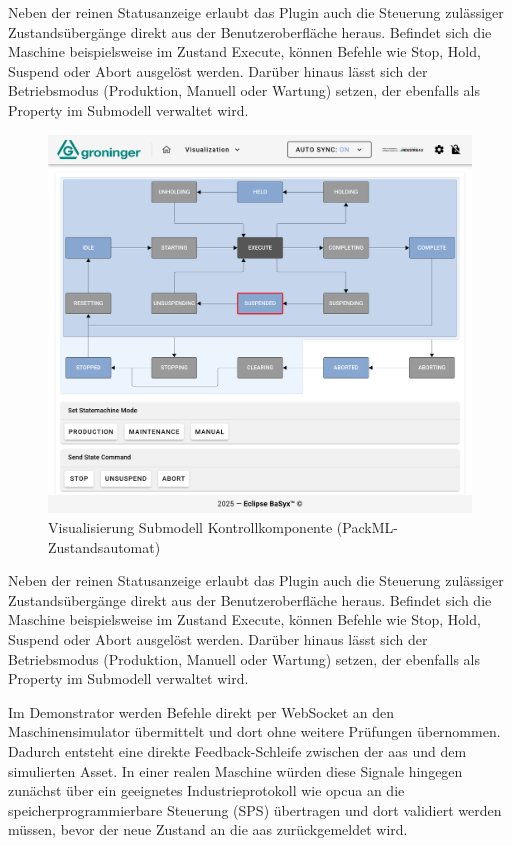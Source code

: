 Neben der reinen Statusanzeige erlaubt das Plugin auch die Steuerung zulässiger Zustandsübergänge direkt aus der Benutzeroberfläche heraus.
Befindet sich die Maschine beispielsweise im Zustand Execute, können Befehle wie Stop, Hold, Suspend oder Abort ausgelöst werden.
Darüber hinaus lässt sich der Betriebsmodus (Produktion, Manuell oder Wartung) setzen, der ebenfalls als Property im Submodell verwaltet wird.

\begin{figure}[htbp]
    \centering 
    \includegraphics[width=1\textwidth]{Bilder/ErgebnisseAASWebUI/Kontrollkomponente.png} 
    \caption{Visualisierung Submodell Kontrollkomponente (PackML-Zustandsautomat)} 
    \label{fig:PackMLZustandsautomat} 
\end{figure}
\vspace{-0.5em}

Neben der reinen Statusanzeige erlaubt das Plugin auch die Steuerung zulässiger Zustandsübergänge direkt aus der Benutzeroberfläche heraus.
Befindet sich die Maschine beispielsweise im Zustand Execute, können Befehle wie Stop, Hold, Suspend oder Abort ausgelöst werden.
Darüber hinaus lässt sich der Betriebsmodus (Produktion, Manuell oder Wartung) setzen, der ebenfalls als Property im Submodell verwaltet wird.


Im Demonstrator werden Befehle direkt per WebSocket an den Maschinensimulator übermittelt und dort ohne weitere Prüfungen übernommen. 
Dadurch entsteht eine direkte Feedback-Schleife zwischen der \acs{aas} und dem simulierten Asset.
In einer realen Maschine würden diese Signale hingegen zunächst über ein geeignetes Industrieprotokoll wie \acs{opcua} an die speicherprogrammierbare Steuerung (SPS) übertragen und dort validiert werden müssen, bevor der neue Zustand an die \acs{aas} zurückgemeldet wird.

